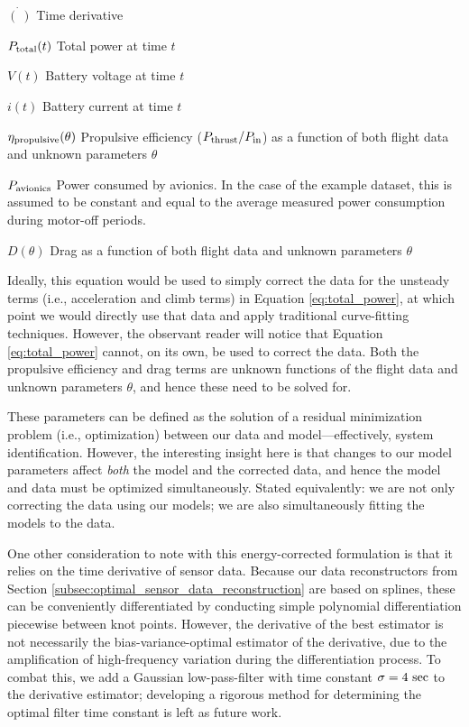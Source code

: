 \documentclass[conf]{new-aiaa}
\begin{document}
    \begin{eqexpl}
        \item {$\dot{(\:)}$} Time derivative
        \item {$P_{\rm total}(t)$} Total power at time $t$
        \item {$V(t)$} Battery voltage at time $t$
        \item {$i(t)$} Battery current at time $t$
        \item {$\eta_{\rm propulsive}(\theta)$} Propulsive efficiency ($P_{\rm thrust} / P_{\rm in}$) as a function of both flight data and unknown parameters $\theta$
        \item {$P_{\rm avionics}$} Power consumed by avionics. In the case of the example dataset, this is assumed to be constant and equal to the average measured power consumption during motor-off periods.
        \item {$D(\theta)$} Drag as a function of both flight data and unknown parameters $\theta$
    \end{eqexpl}

    Ideally, this equation would be used to simply correct the data for the unsteady terms (i.e., acceleration and climb terms) in Equation \ref{eq:total_power}, at which point we would directly use that data and apply traditional curve-fitting techniques. However, the observant reader will notice that Equation \ref{eq:total_power} cannot, on its own, be used to correct the data. Both the propulsive efficiency and drag terms are unknown functions of the flight data and unknown parameters $\theta$, and hence these need to be solved for.

    These parameters can be defined as the solution of a residual minimization problem (i.e., optimization) between our data and model—effectively, system identification. However, the interesting insight here is that changes to our model parameters affect \textit{both} the model and the corrected data, and hence the model and data must be optimized simultaneously. Stated equivalently: we are not only correcting the data using our models; we are also simultaneously fitting the models to the data.

    One other consideration to note with this energy-corrected formulation is that it relies on the time derivative of sensor data. Because our data reconstructors from Section \ref{subsec:optimal_sensor_data_reconstruction} are based on splines, these can be conveniently differentiated by conducting simple polynomial differentiation piecewise between knot points. However, the derivative of the best estimator is not necessarily the bias-variance-optimal estimator of the derivative, due to the amplification of high-frequency variation during the differentiation process. To combat this, we add a Gaussian low-pass-filter with time constant $\sigma=4\ \rm sec$ to the derivative estimator; developing a rigorous method for determining the optimal filter time constant is left as future work.
\end{document}
